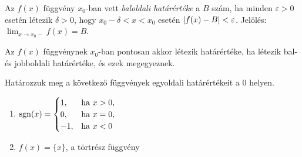 \documentclass[11pt]{article}
\begin{document}
\begin{defbox}
\begin{definition}
Az $f(x)$ függvény $x_{0}$-ban vett \emph{baloldali határértéke} a $B$ szám, ha minden $\varepsilon>0$ esetén létezik $\delta>0$, hogy $x_{0}-\delta<x<x_{0}$ esetén $\left|f(x)-B\right|<\varepsilon$. Jelölés: $\displaystyle\lim_{x\to x_{0}-}f(x)=B$.
\end{definition}
\end{defbox}

\begin{remark}
Az $f(x)$ függvénynek $x_{0}$-ban pontosan akkor létezik határértéke, ha létezik bal- és jobboldali határértéke, és ezek megegyeznek.
\end{remark}

\begin{exbox}
\begin{example}
Határozzuk meg a következő függvények egyoldali határértékeit a $0$ helyen.
\begin{enumerate}[label=\arabic*., itemsep=2pt]
\item $\operatorname{sgn}(x)=\begin{cases}1, & \text{ha } x>0,\\ 0, & \text{ha } x=0,\\ -1, & \text{ha } x<0\end{cases}$
\item $f(x)=\{x\}$, a törtrész függvény
\end{enumerate}
\end{example}
\end{exbox}
\end{document}
